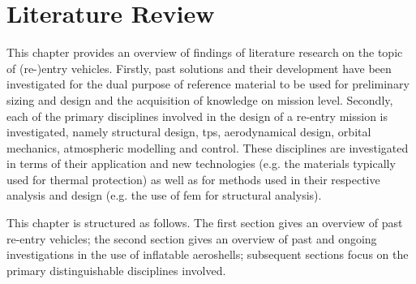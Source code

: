 \section{Literature Review}\label{cha:litreview}
This chapter provides an overview of findings of literature research on the topic of (re-)entry vehicles. Firstly, past solutions and their development have been investigated for the dual purpose of reference material to be used for preliminary sizing and design and the acquisition of knowledge on mission level. Secondly, each of the primary disciplines involved in the design of a re-entry mission is investigated, namely structural design, \gls{tps}, aerodynamical design, orbital mechanics, atmospheric modelling and control. These disciplines are investigated in terms of their application and new technologies (e.g. the materials typically used for thermal protection) as well as for methods used in their respective analysis and design (e.g. the use of \gls{fem} for structural analysis).

This chapter is structured as follows. The first section gives an overview of past re-entry vehicles; the second section gives an overview of past and ongoing investigations in the use of inflatable aeroshells; subsequent sections focus on the primary distinguishable disciplines involved.


